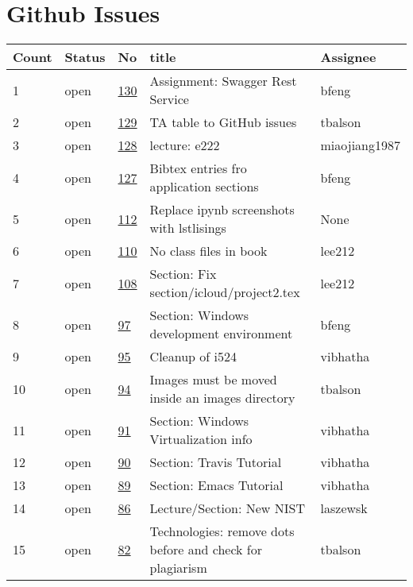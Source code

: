 \section{Github Issues}
\begin{center}
\begin{longtable}{lllll}
Count & Status & No & title & Assignee\\
\hline
1 & open & \href{https://github.com/cloudmesh/book/issues/130}{130} & Assignment: Swagger Rest Service & bfeng\\
2 & open & \href{https://github.com/cloudmesh/book/issues/129}{129} & TA table to GitHub issues & tbalson\\
3 & open & \href{https://github.com/cloudmesh/book/issues/128}{128} & lecture: e222  & miaojiang1987\\
4 & open & \href{https://github.com/cloudmesh/book/issues/127}{127} & Bibtex entries fro application sections & bfeng\\
5 & open & \href{https://github.com/cloudmesh/book/issues/112}{112} & Replace ipynb screenshots with lstlisings & None\\
6 & open & \href{https://github.com/cloudmesh/book/issues/110}{110} & No class files in book & lee212\\
7 & open & \href{https://github.com/cloudmesh/book/issues/108}{108} & Section: Fix section/icloud/project2.tex & lee212\\
8 & open & \href{https://github.com/cloudmesh/book/issues/97}{97} & Section: Windows development environment & bfeng\\
9 & open & \href{https://github.com/cloudmesh/book/issues/95}{95} & Cleanup of i524  & vibhatha\\
10 & open & \href{https://github.com/cloudmesh/book/issues/94}{94} & Images must be moved inside an images directory & tbalson\\
11 & open & \href{https://github.com/cloudmesh/book/issues/91}{91} & Section: Windows Virtualization info & vibhatha\\
12 & open & \href{https://github.com/cloudmesh/book/issues/90}{90} & Section: Travis Tutorial & vibhatha\\
13 & open & \href{https://github.com/cloudmesh/book/issues/89}{89} & Section: Emacs Tutorial & vibhatha\\
14 & open & \href{https://github.com/cloudmesh/book/issues/86}{86} & Lecture/Section: New NIST & laszewsk\\
15 & open & \href{https://github.com/cloudmesh/book/issues/82}{82} & Technologies: remove  dots before \cite{} and check for plagiarism & tbalson\\

\end{longtable}
\end{center}
